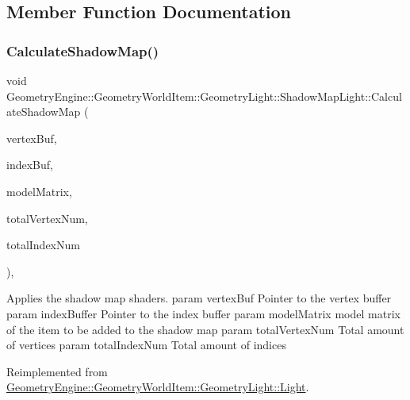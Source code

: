 \subsection{Member Function Documentation}
\mbox{\label{class_geometry_engine_1_1_geometry_world_item_1_1_geometry_light_1_1_shadow_map_light_a518efafd59e2dcd446140ae82140e172}} 
\subsubsection{\texorpdfstring{CalculateShadowMap()}{CalculateShadowMap()}}
{\footnotesize\ttfamily void Geometry\+Engine\+::\+Geometry\+World\+Item\+::\+Geometry\+Light\+::\+Shadow\+Map\+Light\+::\+Calculate\+Shadow\+Map (\begin{DoxyParamCaption}\item[{Q\+Open\+G\+L\+Buffer $\ast$}]{vertex\+Buf,  }\item[{Q\+Open\+G\+L\+Buffer $\ast$}]{index\+Buf,  }\item[{const Q\+Matrix4x4 \&}]{model\+Matrix,  }\item[{unsigned int}]{total\+Vertex\+Num,  }\item[{unsigned int}]{total\+Index\+Num }\end{DoxyParamCaption})\hspace{0.3cm}{\ttfamily [override]}, {\ttfamily [virtual]}}

Applies the shadow map shaders. param vertex\+Buf Pointer to the vertex buffer param index\+Buffer Pointer to the index buffer param model\+Matrix model matrix of the item to be added to the shadow map param total\+Vertex\+Num Total amount of vertices param total\+Index\+Num Total amount of indices 

Reimplemented from \mbox{\hyperlink{class_geometry_engine_1_1_geometry_world_item_1_1_geometry_light_1_1_light_a76aff3602f7bf26416c36111ab79f898}{Geometry\+Engine\+::\+Geometry\+World\+Item\+::\+Geometry\+Light\+::\+Light}}.

\mbox{\label{class_geometry_engine_1_1_geometry_world_item_1_1_geometry_light_1_1_shadow_map_light_a48eb6af2e6bb8487568ee4265fbc49ee}} 
